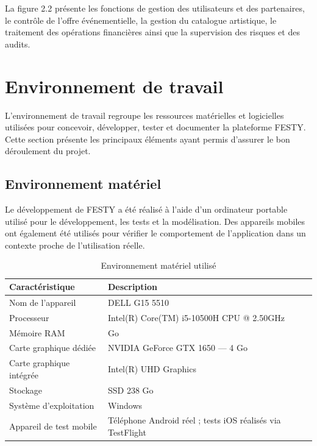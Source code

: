 La figure 2.2 présente les fonctions de gestion des utilisateurs et des partenaires, le contrôle de l’offre événementielle, la gestion du catalogue artistique, le traitement des opérations financières ainsi que la supervision des risques et des audits.


\section{Environnement de travail}


L’environnement de travail regroupe les ressources matérielles et logicielles utilisées pour concevoir, développer, tester et documenter la plateforme FESTY. Cette section présente les principaux éléments ayant permis d’assurer le bon déroulement du projet.


\subsection{Environnement matériel}


Le développement de FESTY a été réalisé à l’aide d’un ordinateur portable utilisé pour le développement, les tests et la modélisation. Des appareils mobiles ont également été utilisés pour vérifier le comportement de l’application dans un contexte proche de l’utilisation réelle.


\begin{table}[H]
\centering
\caption{Environnement matériel utilisé}
\label{tableau:2-8}
\renewcommand{\arraystretch}{1.2}
\begin{tabularx}{\textwidth}{|>{\raggedright\arraybackslash}X|>{\raggedright\arraybackslash}X|}
\hline
\rowcolor[HTML]{ECF4FF}
\textbf{Caractéristique} & \textbf{Description} \\
\hline
Nom de l’appareil & DELL G15 5510 \\
\hline
Processeur & Intel(R) Core(TM) i5-10500H CPU @ 2.50GHz \\
\hline
Mémoire RAM & 24 Go \\
\hline
Carte graphique dédiée & NVIDIA GeForce GTX 1650 — 4 Go \\
\hline
Carte graphique intégrée & Intel(R) UHD Graphics \\
\hline
Stockage & SSD 238 Go \\
\hline
Système d’exploitation & Windows \\
\hline
Appareil de test mobile & Téléphone Android réel ; tests iOS réalisés via TestFlight \\
\hline
\end{tabularx}
\end{table}


